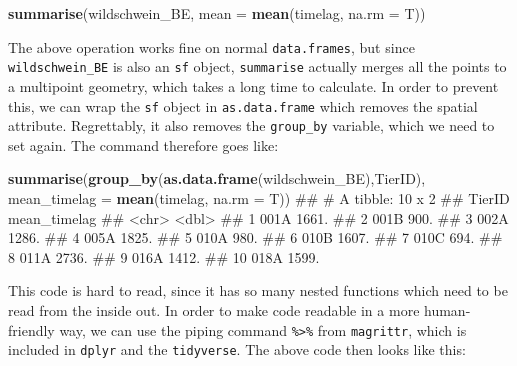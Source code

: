 \documentclass[]{book}
\newenvironment{Shaded}{\begin{snugshade}}{\end{snugshade}}
\newcommand{\KeywordTok}[1]{\textcolor[rgb]{0.13,0.29,0.53}{\textbf{{#1}}}}
\newcommand{\DataTypeTok}[1]{\textcolor[rgb]{0.13,0.29,0.53}{{#1}}}
\newcommand{\NormalTok}[1]{{#1}}
\theoremstyle{definition}
\theoremstyle{definition}
\theoremstyle{definition}
\theoremstyle{remark}
\begin{document}
\begin{Shaded}
\begin{Highlighting}[]
\KeywordTok{summarise}\NormalTok{(wildschwein_BE, }\DataTypeTok{mean =} \KeywordTok{mean}\NormalTok{(timelag, }\DataTypeTok{na.rm =} \NormalTok{T))}
\end{Highlighting}
\end{Shaded}

The above operation works fine on normal \texttt{data.frames}, but since
\texttt{wildschwein\_BE} is also an \texttt{sf} object,
\texttt{summarise} actually merges all the points to a multipoint
geometry, which takes a long time to calculate. In order to prevent
this, we can wrap the \texttt{sf} object in \texttt{as.data.frame} which
removes the spatial attribute. Regrettably, it also removes the
\texttt{group\_by} variable, which we need to set again. The command
therefore goes like:

\begin{Shaded}
\begin{Highlighting}[]
\KeywordTok{summarise}\NormalTok{(}\KeywordTok{group_by}\NormalTok{(}\KeywordTok{as.data.frame}\NormalTok{(wildschwein_BE),TierID), }\DataTypeTok{mean_timelag =} \KeywordTok{mean}\NormalTok{(timelag, }\DataTypeTok{na.rm =} \NormalTok{T))}
\NormalTok{## # A tibble: 10 x 2}
\NormalTok{##    TierID mean_timelag}
\NormalTok{##    <chr>         <dbl>}
\NormalTok{##  1 001A          1661.}
\NormalTok{##  2 001B           900.}
\NormalTok{##  3 002A          1286.}
\NormalTok{##  4 005A          1825.}
\NormalTok{##  5 010A           980.}
\NormalTok{##  6 010B          1607.}
\NormalTok{##  7 010C           694.}
\NormalTok{##  8 011A          2736.}
\NormalTok{##  9 016A          1412.}
\NormalTok{## 10 018A          1599.}
\end{Highlighting}
\end{Shaded}

This code is hard to read, since it has so many nested functions which
need to be read from the inside out. In order to make code readable in a
more human-friendly way, we can use the piping command
\texttt{\%\textgreater{}\%} from \texttt{magrittr}, which is included in
\texttt{dplyr} and the \texttt{tidyverse}. The above code then looks
like this:
\end{document}
